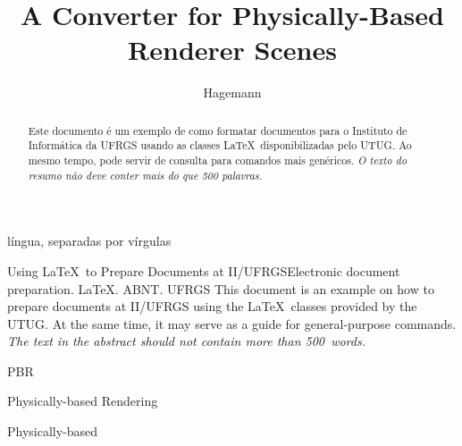 \documentclass[cic,tc,english]{iiufrgs}
\title{A Converter for Physically-Based Renderer Scenes}
\author{Hagemann}{Luiza de Azambuja}
\begin{document}
\maketitle




\begin{abstract}
    Este documento é um exemplo de como formatar documentos para o
    Instituto de Informática da UFRGS usando as classes \LaTeX\
    disponibilizadas pelo UTUG\@. Ao mesmo tempo, pode servir de consulta
    para comandos mais genéricos. \emph{O texto do resumo não deve
      conter mais do que 500 palavras.}
\end{abstract}

língua, separadas por vírgulas
\begin{englishabstract}{Using \LaTeX\ to Prepare Documents at 
II/UFRGS}{Electronic document preparation. \LaTeX. ABNT. UFRGS}
    This document is an example on how to prepare documents at II/UFRGS
    using the \LaTeX\ classes provided by the UTUG\@. At the same time, it
    may serve as a guide for general-purpose commands. \emph{The text in
      the abstract should not contain more than 500~words.}
\end{englishabstract}



\begin{listofabbrv}{PBR}
    \item[PBR] Physically-based Rendering
    \item[PB] Physically-based
\end{listofabbrv}
\end{document}
